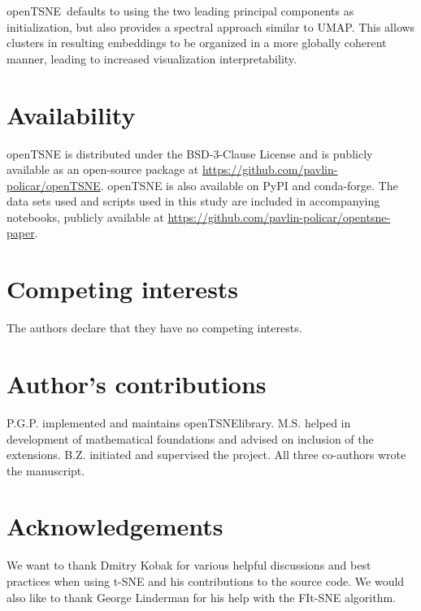 \documentclass[twocolumn]{bmcart}
\newcommand{\opentsne}{\textsf{openTSNE}}
\begin{document}
\opentsne\ defaults to using the two leading principal components as
initialization, but also provides a spectral approach similar to UMAP.
This allows clusters in resulting embeddings to be organized in a more globally coherent
manner, leading to increased visualization interpretability.

\section*{Availability}

openTSNE is distributed under the BSD-3-Clause License and is publicly
available as an open-source package at
\url{https://github.com/pavlin-policar/openTSNE}. openTSNE is also available on
PyPI and conda-forge. The data sets used and scripts used in this study are
included in accompanying notebooks, publicly available at
\url{https://github.com/pavlin-policar/opentsne-paper}.

\begin{backmatter}

\section*{Competing interests}
The authors declare that they have no competing interests.

\section*{Author's contributions}
P.G.P. implemented and maintains \opentsne library. M.S. helped in development of mathematical foundations and advised on inclusion of the extensions. B.Z. initiated and supervised the project. All three co-authors wrote the manuscript.

\section*{Acknowledgements}
We want to thank Dmitry Kobak for various helpful discussions and best practices when using t-SNE and his contributions to the source code. We would also like to thank George Linderman for his help with the FIt-SNE algorithm.


\end{backmatter}
\end{document}
